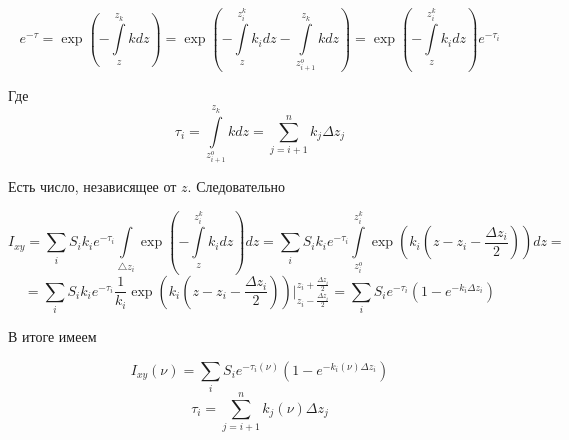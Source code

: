 \documentclass{article}
\begin{document}
$$e^{-\tau} = \exp \left( -\int \limits_z^{z_k} kdz\right) = 
\exp \left( -\int \limits_z^{z_i^k} k_idz - \int \limits_{z_{i+1}^o}^{z_k} kdz\right) = \exp \left( -\int \limits_z^{z_i^k} k_idz\right) e^{ -\tau_i}  $$

Где 
$$\tau_i = \int \limits_{z_{i+1}^o}^{z_k} kdz = \sum \limits_{j=i+1}^n k_j\Delta z_j$$

Есть число, независящее от $z$. Следовательно 

$$I_{xy} = \sum \limits_i S_i k_i e^{-\tau_i} \int \limits_{\triangle z_i} \exp\left( -\int \limits_z^{z_i^k}k_idz\right)dz = \sum \limits_i S_i k_i e^{-\tau_i} \int \limits_{z_i^o}^{z_i^k} \exp\left( k_i\left(z - z_i - \frac{\Delta z_i}{2}\right)\right)dz = $$
$$ =\sum \limits_i S_i k_i e^{-\tau_i} \frac{1}{k_i} \exp\left( k_i\left(z - z_i - \frac{\Delta z_i}{2}\right)\right)\Biggr|_{z_i - \frac{\Delta z_i}{2}}^{z_i + \frac{\Delta z_i}{2}} =  \sum \limits_i S_i e^{-\tau_i}\left( 1 - e^{-k_i\Delta z_i} \right) $$

В итоге имеем

$$ I_{xy}(\nu) = \sum \limits_i S_i e^{-\tau_i(\nu)}\left( 1 - e^{-k_i(\nu)\Delta z_i} \right) $$
$$\tau_i = \sum \limits_{j=i+1}^n k_j(\nu)\Delta z_j$$
\end{document}
